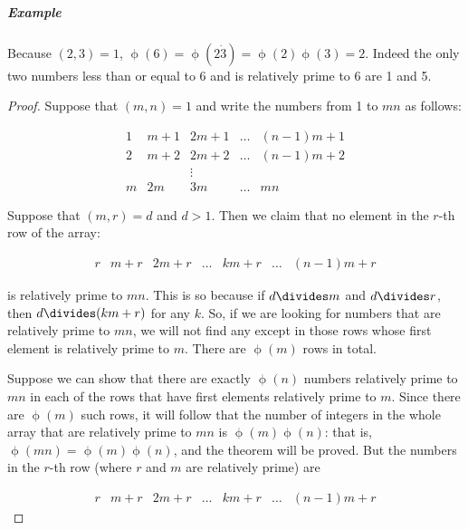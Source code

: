 \documentclass{article}
\theoremstyle{definition} %
\theoremstyle{definition}
\theoremstyle{definition}
\newcommand{\tot}{\upphi}
\theoremstyle{definition}
\begin{document}
  \subparagraph{Example} Because $(2, 3) = 1$, $\tot(6) = \tot(2\dot 3) = \tot(2)\tot(3) = 2$.
  Indeed the only two numbers less than or equal to 6 and is relatively prime to 6 are 1 and 5.
  
  \begin{proof}
    Suppose that $(m, n) = 1$ and write the numbers from 1 to $mn$ as follows:
    
    \begin{equation*}
    \begin{matrix}
      1 & m + 1 & 2m + 1 & \dots & (n-1)m + 1 \\
      2 & m + 2 & 2m + 2 & \dots & (n-1)m + 2 \\
         &           &  \vdots         &           \\
      m & 2m & 3m & \dots & mn
    \end{matrix}
    \end{equation*}
    
    Suppose that $(m, r) = d$ and $d > 1$. Then we claim that no element in
    the $r$-th row of the array:
    
    \begin{equation*}
    \begin{matrix}
      r & m + r & 2m + r & \dots & km + r  & \dots & (n-1)m + r
    \end{matrix}
    \end{equation*}
    
    is relatively prime to $mn$. This is so because if $d \divides m$ and
    $d \divides r$, then $d \divides (km + r)$ for any $k$. So, if we are looking
    for numbers that are relatively prime to $mn$, we will not find any except
    in those rows whose first element is relatively prime to $m$. There are
    $\tot(m)$ rows in total.
    
    Suppose we can show that there are exactly $\tot(n)$ numbers relatively
    prime to $mn$ in each of the rows that have first elements relatively prime
    to $m$. Since there are $\tot(m)$ such rows, it will follow that the number
    of integers in the whole array that are relatively prime to $mn$ is
    $\tot(m)\tot(n)$: that is, $\tot(mn) = \tot(m)\tot(n)$, and the theorem will
    be proved. But the numbers in the $r$-th row (where $r$ and $m$ are
    relatively prime) are
    
    \begin{equation}
    \begin{matrix}
      r & m + r & 2m + r & \dots & km + r  & \dots & (n-1)m + r
    \end{matrix}
    \end{equation}
    

\end{proof}
\end{document}
